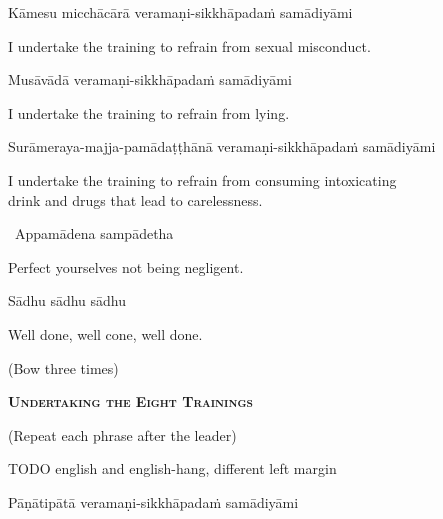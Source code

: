 Kāmesu micchācārā veramaṇi-sikkhāpadaṁ samādiyāmi

\begin{english}
  I undertake the training to refrain from sexual misconduct.
\end{english}

Musāvādā veramaṇi-sikkhāpadaṁ samādiyāmi

\begin{english}
  I undertake the training to refrain from lying.
\end{english}

\begin{pali-hang}
  Surāmeraya-majja-pamādaṭṭhānā veramaṇi-sikkhāpadaṁ samādiyāmi
\end{pali-hang}

\begin{english-hang}
  I undertake the training to refrain from consuming intoxicating\\
  drink and drugs that lead to carelessness.\hyperlink{endnote140-appendix}{\hypertarget{endnote140-body}{}}
\end{english-hang}

\anglebracketleft\ \hspace{-0.5mm}Appamādena sampādetha \hspace{-0.5mm}\anglebracketright\

\begin{english}
  Perfect yourselves not being negligent.
\end{english}

Sādhu sādhu sādhu

\begin{english}
  Well done, well cone, well done.
\end{english}

(Bow three times)

\clearpage

\begin{center}
  \textbf{\textsc{Undertaking the Eight Trainings}}
\end{center}

\begin{center}
  (Repeat each phrase after the leader)
\end{center}

TODO english and english-hang, different left margin

Pāṇātipātā veramaṇi-sikkhāpadaṁ samādiyāmi

